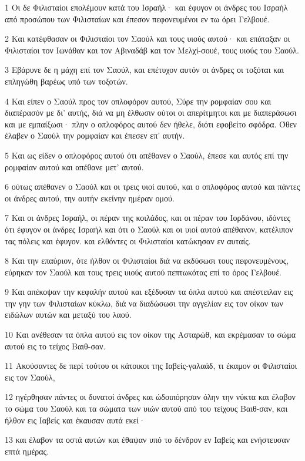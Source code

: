 \par 1 Οι δε Φιλισταίοι επολέμουν κατά του Ισραήλ· και έφυγον οι άνδρες του Ισραήλ από προσώπου των Φιλισταίων και έπεσον πεφονευμένοι εν τω όρει Γελβουέ.
\par 2 Και κατέφθασαν οι Φιλισταίοι τον Σαούλ και τους υιούς αυτού· και επάταξαν οι Φιλισταίοι τον Ιωνάθαν και τον Αβιναδάβ και τον Μελχί-σουέ, τους υιούς του Σαούλ.
\par 3 Εβάρυνε δε η μάχη επί τον Σαούλ, και επέτυχον αυτόν οι άνδρες οι τοξόται και επληγώθη βαρέως υπό των τοξοτών.
\par 4 Και είπεν ο Σαούλ προς τον οπλοφόρον αυτού, Σύρε την ρομφαίαν σου και διαπέρασόν με δι' αυτής, διά να μη έλθωσιν ούτοι οι απερίτμητοι και με διαπεράσωσι και με εμπαίξωσι· πλην ο οπλοφόρος αυτού δεν ήθελε, διότι εφοβείτο σφόδρα. Όθεν έλαβεν ο Σαούλ την ρομφαίαν και έπεσεν επ' αυτήν.
\par 5 Και ως είδεν ο οπλοφόρος αυτού ότι απέθανεν ο Σαούλ, έπεσε και αυτός επί την ρομφαίαν αυτού και απέθανε μετ' αυτού.
\par 6 ούτως απέθανεν ο Σαούλ και οι τρεις υιοί αυτού, και ο οπλοφόρος αυτού και πάντες οι άνδρες αυτού, την αυτήν εκείνην ημέραν ομού.
\par 7 Και οι άνδρες Ισραήλ, οι πέραν της κοιλάδος, και οι πέραν του Ιορδάνου, ιδόντες ότι έφυγον οι άνδρες Ισραήλ και ότι ο Σαούλ και οι υιοί αυτού απέθανον, κατέλιπον τας πόλεις και έφυγον. και ελθόντες οι Φιλισταίοι κατώκησαν εν αυταίς.
\par 8 Και την επαύριον, ότε ήλθον οι Φιλισταίοι διά να εκδύσωσι τους πεφονευμένους, εύρηκαν τον Σαούλ και τους τρεις υιούς αυτού πεπτωκότας επί το όρος Γελβουέ.
\par 9 Και απέκοψαν την κεφαλήν αυτού και εξέδυσαν τα όπλα αυτού και απέστειλαν εις την γην των Φιλισταίων κύκλω, διά να διαδώσωσι την αγγελίαν εις τον οίκον των ειδώλων αυτών και μεταξύ του λαού.
\par 10 Και ανέθεσαν τα όπλα αυτού εις τον οίκον της Ασταρώθ, και εκρέμασαν το σώμα αυτού εις το τείχος Βαιθ-σαν.
\par 11 Ακούσαντες δε περί τούτου οι κάτοικοι της Ιαβείς-γαλαάδ, τι έκαμον οι Φιλισταίοι εις τον Σαούλ,
\par 12 ηγέρθησαν πάντες οι δυνατοί άνδρες και ώδοιπόρησαν όλην την νύκτα και έλαβον το σώμα του Σαούλ και τα σώματα των υιών αυτού από του τείχους Βαιθ-σαν, και ήλθον εις Ιαβείς και έκαυσαν αυτά εκεί·
\par 13 και έλαβον τα οστά αυτών και έθαψαν υπό το δένδρον εν Ιαβείς και ενήστευσαν επτά ημέρας.


